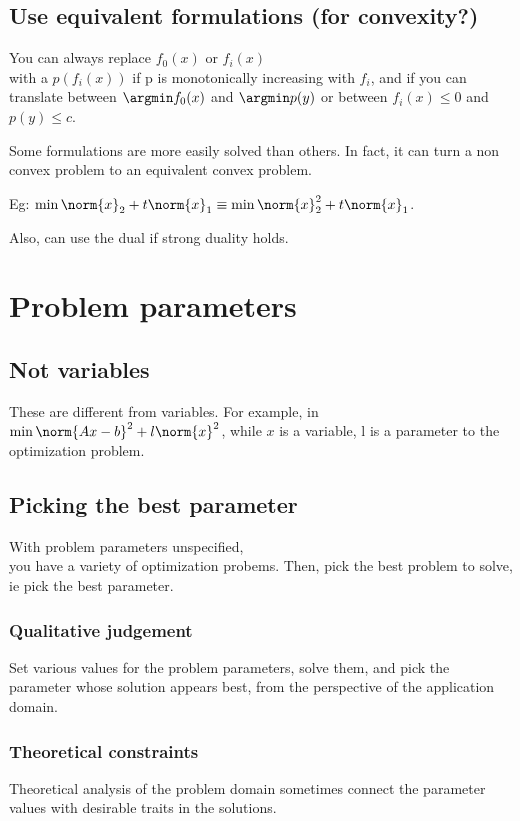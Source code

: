 \documentclass[oneside, article]{memoir}
\begin{document}
\section{Use equivalent formulations (for convexity?)}
You can always replace $f_0(x)$ or $f_i(x)$ \\
with a $p(f_i(x))$ if p is monotonically increasing with $f_i$, and if you can translate between $\argmin f_0(x)$ and $\argmin p(y)$ or between $f_i(x) \leq 0$ and $p(y) \leq c$.

Some formulations are more easily solved than others. In fact, it can turn a non convex problem to an equivalent convex problem.

Eg: $\min \norm{x}_2 + t\norm{x}_1 \equiv \min \norm{x}_2^{2} + t\norm{x}_1$.

Also, can use the dual if strong duality holds.

\chapter{Problem parameters}
\section{Not variables}
These are different from variables. For example, in $\min \norm{Ax - b}^{2} + l \norm{x}^{2}$, while $x$ is a variable, l is a parameter to the optimization problem.

\section{Picking the best parameter}
With problem parameters unspecified,\\
 you have a variety of optimization probems. Then, pick the best problem to solve, ie pick the best parameter.

\subsection{Qualitative judgement}
Set various values for the problem parameters, solve them, and pick the parameter whose solution appears best, from the perspective of the application domain.

\subsection{Theoretical constraints}
Theoretical analysis of the problem domain sometimes connect the parameter values with desirable traits in the solutions.
\end{document}
